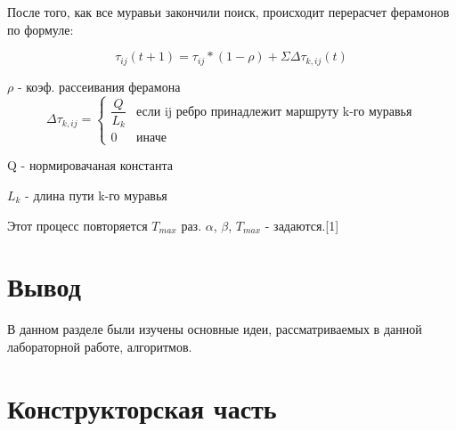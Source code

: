 \documentclass[12pt]{report}
\begin{document}
	После того, как все муравьи закончили поиск, происходит перерасчет ферамонов по формуле:
	
	\begin{equation}
		\tau_{ij}(t+1) = \tau_{ij}*(1-\rho) + \Sigma\Delta\tau_{k,ij}(t)
	\end{equation}

	$\rho$ - коэф. рассеивания ферамона
	\begin{equation}
	\Delta\tau_{k,ij} = \begin{cases}
	\dfrac{Q}{L_{k}}
	& \textrm{если ij ребро принадлежит маршруту k-го муравья}\\ 
	0 & \textrm{иначе}
	\end{cases}
	\end{equation}
	
	Q - нормировачаная константа
	
	$L_{k}$ - длина пути k-го муравья

	Этот процесс повторяется $T_{max}$ раз. $\alpha$, $\beta$, $T_{max}$ - задаются.[1]
	
	\chapter*{Вывод}
	
	В данном разделе были изучены основные идеи, рассматриваемых в данной лабораторной работе, алгоритмов.
	
	\chapter{Конструкторская часть}
\end{document}
